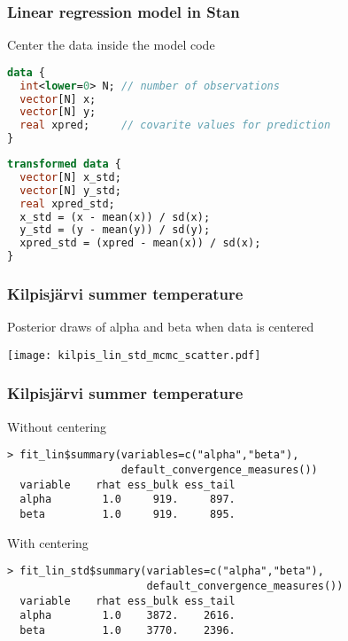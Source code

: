 \documentclass[finnish,english,t]{beamer}
\begin{document}
\begin{frame}[fragile]
  \frametitle{Linear regression model in Stan}

Center the data inside the model code
  
{\scriptsize
  \color{gray}
\begin{lstlisting}[language=Stan]
data {
  int<lower=0> N; // number of observations
  vector[N] x; 
  vector[N] y; 
  real xpred;     // covarite values for prediction
}
\end{lstlisting}
  \color{black}
\begin{lstlisting}[language=Stan]
transformed data {
  vector[N] x_std;
  vector[N] y_std;
  real xpred_std;
  x_std = (x - mean(x)) / sd(x);
  y_std = (y - mean(y)) / sd(y);
  xpred_std = (xpred - mean(x)) / sd(x);
}
\end{lstlisting}
  }
\end{frame}

\begin{frame}[fragile]
  \frametitle{Kilpisjärvi summer temperature}
  
  Posterior draws of alpha and beta when data is centered
  
  \begin{center}
    \texttt{[image: kilpis\_lin\_std\_mcmc\_scatter.pdf]}
  \end{center}

\end{frame}

\begin{frame}[fragile]
  \frametitle{Kilpisjärvi summer temperature}

Without centering  
{\scriptsize
\begin{lstlisting}
> fit_lin$summary(variables=c("alpha","beta"),
                  default_convergence_measures())
  variable    rhat ess_bulk ess_tail
  alpha        1.0     919.     897.
  beta         1.0     919.     895.
\end{lstlisting}
  }

With centering  
{\scriptsize
\begin{lstlisting}
> fit_lin_std$summary(variables=c("alpha","beta"),
                      default_convergence_measures())
  variable    rhat ess_bulk ess_tail
  alpha        1.0    3872.    2616.
  beta         1.0    3770.    2396.
\end{lstlisting}
  }
\end{frame}
\end{document}
